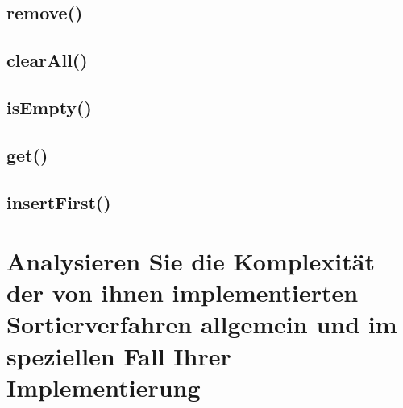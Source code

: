 \documentclass[a4paper, 11pt]{article}
\begin{document}
\subsection*{remove()}

\subsection*{clearAll()}

\subsection*{isEmpty()}

\subsection*{get()}

\subsection*{insertFirst()}

\section*{Analysieren Sie die Komplexität der von ihnen implementierten Sortierverfahren
          allgemein und im speziellen Fall Ihrer Implementierung}
\end{document}
